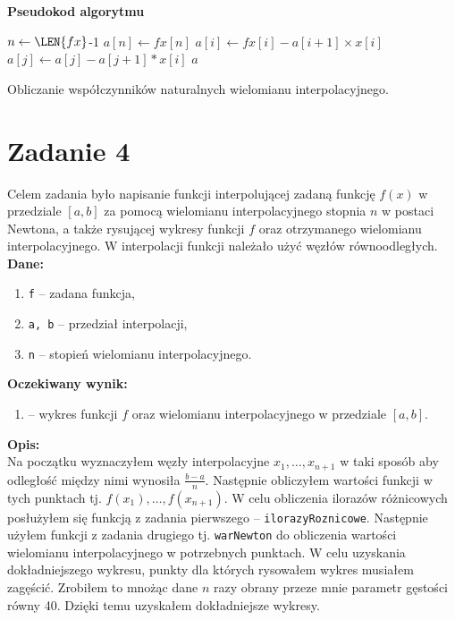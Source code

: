 \documentclass[]{article}
\begin{document}
	\noindent\textbf{Pseudokod algorytmu}\\
	\begin{algorithm}[h]
		\DontPrintSemicolon
		 {
			$n \gets \LEN{fx}$-1\;
			$a[n] \gets fx[n]$\;
			 {
				$a[i] \gets fx[i] - a[i+1] \times x[i]$\; 
				 {
					$a[j] \gets a[j] - a[j+1] * x[i]$\; 	
				}	
			}
			\KwRet $a$\;
		}
		
		\caption{Obliczanie współczynników naturalnych wielomianu interpolacyjnego.}
	\end{algorithm}	
	
	
	
	
	\section*{Zadanie 4}

	Celem zadania było napisanie funkcji interpolującej zadaną funkcję $f(x)$ w przedziale $[a, b]$ za pomocą wielomianu interpolacyjnego stopnia $n$ w postaci Newtona, a także rysującej wykresy funkcji $f$ oraz otrzymanego wielomianu interpolacyjnego. W interpolacji funkcji należało użyć węzłów równoodległych.\\
	\textbf{Dane:}
	\begin{enumerate}[]
		\item \texttt{f} -- zadana funkcja,
		\item \texttt{a, b} --  przedział interpolacji,
		\item \texttt{n} --  stopień wielomianu interpolacyjnego.
	\end{enumerate}
	\textbf{Oczekiwany wynik:}
	\begin{enumerate}[]
		\item -- wykres funkcji $f$ oraz wielomianu interpolacyjnego w przedziale $[a,b]$.
	\end{enumerate}
	\textbf{Opis:}\\
	Na początku wyznaczyłem węzły interpolacyjne $x_1, \ldots, x_{n+1}$ w taki sposób aby odległość między nimi wynosiła $\frac{b-a}{n}$. Następnie obliczyłem wartości funkcji w tych punktach tj. $f(x_1), \ldots, f(x_{n+1})$.
	W celu obliczenia ilorazów różnicowych posłużyłem się funkcją z zadania pierwszego -- \texttt{ilorazyRoznicowe}. Następnie użyłem funkcji z zadania drugiego tj. \texttt{warNewton} do obliczenia wartości wielomianu interpolacyjnego w potrzebnych punktach. W celu uzyskania dokładniejszego wykresu, punkty dla których rysowałem wykres musiałem zagęścić. Zrobiłem to mnożąc dane $n$ razy obrany przeze mnie parametr gęstości równy 40. Dzięki temu uzyskałem dokładniejsze wykresy.
	
\end{document}
